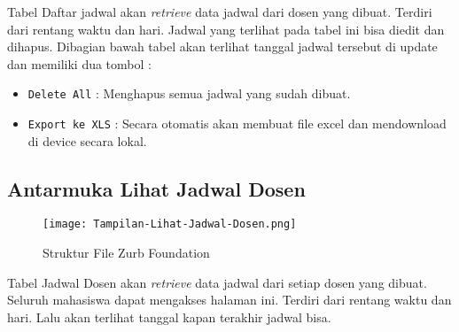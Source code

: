 Tabel Daftar jadwal akan \textit{retrieve} data jadwal dari dosen yang dibuat. Terdiri dari rentang waktu dan hari. Jadwal yang terlihat pada tabel ini bisa diedit dan dihapus.
Dibagian bawah tabel akan terlihat tanggal jadwal tersebut di update dan memiliki dua tombol :
\begin{itemize}
	\item \texttt{Delete All} : Menghapus semua jadwal yang sudah dibuat.
	\item \texttt{Export ke XLS} : Secara otomatis akan membuat file excel dan mendownload di device secara lokal.
\end{itemize}

\subsection{Antarmuka Lihat Jadwal Dosen}
\begin{figure} [H]
	\centering  
	\texttt{[image: Tampilan-Lihat-Jadwal-Dosen.png]}  
	\caption{Struktur File Zurb Foundation} 	
\end{figure}
Tabel Jadwal Dosen akan \textit{retrieve} data jadwal dari setiap dosen yang dibuat. Seluruh mahasiswa dapat mengakses halaman ini. Terdiri dari rentang waktu dan hari. 
Lalu akan terlihat tanggal kapan terakhir jadwal bisa.